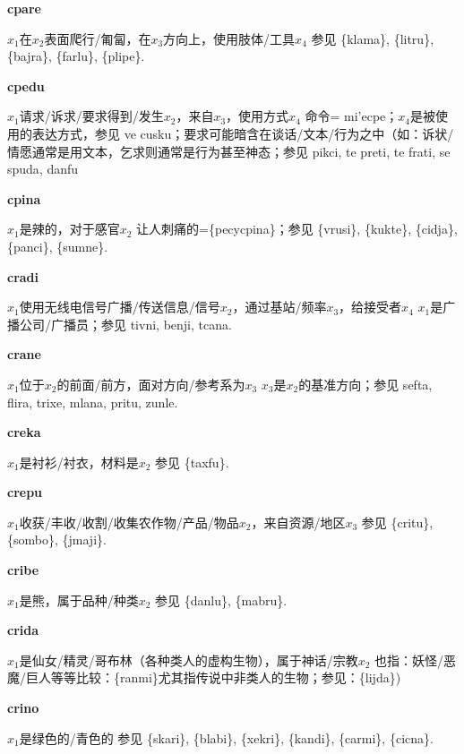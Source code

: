 \documentclass[notitlepage,twocolumn,a4paper,10pt]{book}
\begin{document}
{\sffamily\bfseries cpare}\enspace {\ttfamily\bfseries[par]}  $x_1$在$x_2$表面爬行\slash{}匍匐，在$x_3$方向上，使用肢体\slash{}工具$x_4$ \textemdash{} 参见 \{klama\}, \{litru\}, \{bajra\}, \{farlu\}, \{plipe\}.

{\sffamily\bfseries cpedu}\enspace {\ttfamily\bfseries[    cpe]}  $x_1$请求\slash{}诉求\slash{}要求得到\slash{}发生$x_2$，来自$x_3$，使用方式$x_4$ \textemdash{} 命令= {mi'ecpe}；$x_4$是被使用的表达方式，参见 ve {cusku}；要求可能暗含在谈话\slash{}文本\slash{}行为之中（如：诉状\slash{}情愿通常是用文本，乞求则通常是行为甚至神态；参见 {pikci}, te {preti}, te {frati}, se {spuda}, {danfu}

{\sffamily\bfseries cpina} $x_1$是辣的，对于感官$x_2$ \textemdash{} 让人刺痛的=\{pecycpina\}；参见 \{vrusi\}, \{kukte\}, \{cidja\}, \{panci\}, \{sumne\}.

{\sffamily\bfseries cradi} $x_1$使用无线电信号广播\slash{}传送信息\slash{}信号$x_2$，通过基站\slash{}频率$x_3$，给接受者$x_4$ \textemdash{} $x_1$是广播公司\slash{}广播员；参见 {tivni}, {benji}, {tcana}.

{\sffamily\bfseries crane}\enspace {\ttfamily\bfseries[    cra]}  $x_1$位于$x_2$的前面\slash{}前方，面对方向\slash{}参考系为$x_3$ \textemdash{} $x_3$是$x_2$的基准方向；参见 {sefta}, {flira}, {trixe}, {mlana}, {pritu}, {zunle}.

{\sffamily\bfseries creka}\enspace {\ttfamily\bfseries[cek]}  $x_1$是衬衫\slash{}衬衣，材料是$x_2$ \textemdash{} 参见 \{taxfu\}.

{\sffamily\bfseries crepu}\enspace {\ttfamily\bfseries[rep]}  $x_1$收获\slash{}丰收\slash{}收割\slash{}收集农作物\slash{}产品\slash{}物品$x_2$，来自资源\slash{}地区$x_3$ \textemdash{} 参见 \{critu\}, \{sombo\}, \{jmaji\}.

{\sffamily\bfseries cribe}\enspace {\ttfamily\bfseries[rib]}  $x_1$是熊，属于品种\slash{}种类$x_2$ \textemdash{} 参见 \{danlu\}, \{mabru\}.

{\sffamily\bfseries crida}\enspace {\ttfamily\bfseries[rid]}  $x_1$是仙女\slash{}精灵\slash{}哥布林（各种类人的虚构生物），属于神话\slash{}宗教$x_2$ \textemdash{} 也指：妖怪\slash{}恶魔\slash{}巨人等等比较：\{ranmi\}尤其指传说中非类人的生物；参见：\{lijda\})

{\sffamily\bfseries crino}\enspace {\ttfamily\bfseries[        ri'o]}  $x_1$是绿色的\slash{}青色的 \textemdash{} 参见 \{skari\}, \{blabi\}, \{xekri\}, \{kandi\}, \{carmi\}, \{cicna\}.
\end{document}
